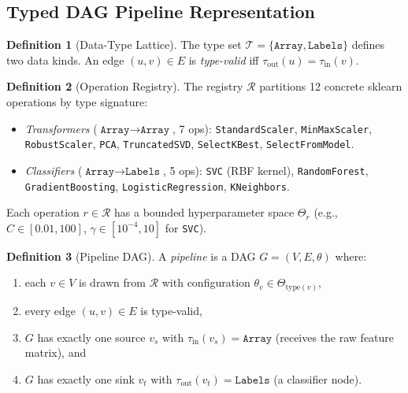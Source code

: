 \documentclass{article}
\theoremstyle{definition}
\newtheorem{definition}{Definition}[section]
\theoremstyle{plain}
\theoremstyle{remark}
\begin{document}
\subsection{Typed DAG Pipeline Representation}
\label{sec:rep}

\begin{definition}[Data-Type Lattice]
The type set $\mathcal{T} = \{\texttt{Array}, \texttt{Labels}\}$ defines two
data kinds.
An edge $(u, v) \in E$ is \emph{type-valid} iff
$\tau_{\mathrm{out}}(u) = \tau_{\mathrm{in}}(v)$.
\end{definition}

\begin{definition}[Operation Registry]
\label{def:registry}
The registry $\mathcal{R}$ partitions 12 concrete sklearn operations by type
signature:
\begin{itemize}[leftmargin=1.2em]
  \item \textit{Transformers} ($\texttt{Array} \to \texttt{Array}$, 7 ops):
        \texttt{StandardScaler}, \texttt{MinMaxScaler}, \texttt{RobustScaler},
        \texttt{PCA}, \texttt{TruncatedSVD}, \texttt{SelectKBest},
        \texttt{SelectFromModel}.
  \item \textit{Classifiers} ($\texttt{Array} \to \texttt{Labels}$, 5 ops):
        \texttt{SVC} (RBF kernel), \texttt{RandomForest},
        \texttt{GradientBoosting}, \texttt{LogisticRegression},
        \texttt{KNeighbors}.
\end{itemize}
Each operation $r \in \mathcal{R}$ has a bounded hyperparameter space
$\Theta_r$ (e.g., $C \in [0.01, 100]$, $\gamma \in [10^{-4}, 10]$ for
\texttt{SVC}).
\end{definition}

\begin{definition}[Pipeline DAG]
\label{def:dag}
A \emph{pipeline} is a DAG $G = (V, E, \theta)$ where:
\begin{enumerate}
  \item each $v \in V$ is drawn from $\mathcal{R}$ with configuration
        $\theta_v \in \Theta_{\mathrm{type}(v)}$,
  \item every edge $(u,v) \in E$ is type-valid,
  \item $G$ has exactly one source $v_s$ with
        $\tau_{\mathrm{in}}(v_s) = \texttt{Array}$
        (receives the raw feature matrix), and
  \item $G$ has exactly one sink $v_t$ with
        $\tau_{\mathrm{out}}(v_t) = \texttt{Labels}$
        (a classifier node).
\end{enumerate}
\end{definition}
\end{document}
